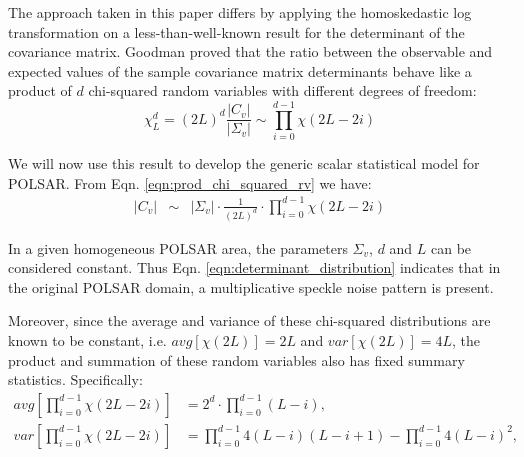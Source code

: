 \documentclass[journal]{IEEEtran}
\begin{document}
The approach taken in this paper differs by applying the homoskedastic log transformation  on a less-than-well-known result for the determinant of the covariance matrix.
Goodman \cite{Goodman_1963_AMS_178} proved
that the ratio between the observable and expected values of the sample covariance matrix determinants
  behave like a product of $d$ chi-squared random variables with different degrees of freedom: 
\begin{equation}
\chi^d_L = (2L)^d \frac{|C_v|}{|\Sigma_v|} \sim \prod_{i=0}^{d-1} \chi (2L-2i)
\label{eqn:prod_chi_squared_rv}  
\end{equation}

We will now use this result to develop the generic scalar statistical model for POLSAR. %
From Eqn. \ref{eqn:prod_chi_squared_rv} %
we have: %
\begin{eqnarray}
  |C_v| &\sim& |\Sigma_v| \cdot \frac{1}{(2L)^d} \cdot \prod_{i=0}^{d-1} \chi (2L-2i) \label{eqn:determinant_distribution} %
\end{eqnarray}

In a given homogeneous POLSAR area, the parameters $\Sigma_v$, $d$ and $L$ can be considered constant.
Thus Eqn. \ref{eqn:determinant_distribution} indicates that 
  in the original POLSAR domain, a multiplicative speckle noise pattern is present.

Moreover, since the average and variance of these chi-squared distributions %
  are known to be constant, i.e. $avg \left[ \chi(2L) \right] = 2L$ and $var \left[ \chi(2L) \right] = 4L$,
  the product and summation of these random variables also has fixed summary statistics.
Specifically:
{\footnotesize
\begin{align*}
  avg \left[ \prod^{d-1}_{i=0} \chi(2L-2i) \right] &= 2^d \cdot \prod^{d-1}_{i=0} (L-i), \\
  var \left[ \prod^{d-1}_{i=0} \chi(2L-2i) \right] &= \prod^{d-1}_{i=0} 4(L-i)(L-i+1) - \prod^{d-1}_{i=0} 4(L-i)^2, %
\end{align*}
}
\end{document}
